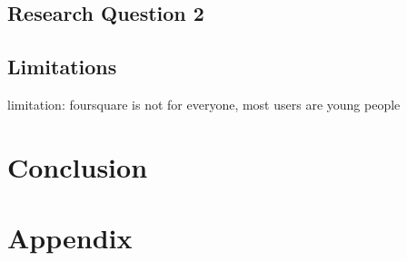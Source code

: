 \documentclass{article}
\begin{document}
\subsection{Research Question 2}

\subsection{Limitations}
limitation: foursquare is not for everyone, most users are young people


\newpage


\section{Conclusion}
\newpage







\newpage
\section{Appendix}
\end{document}
